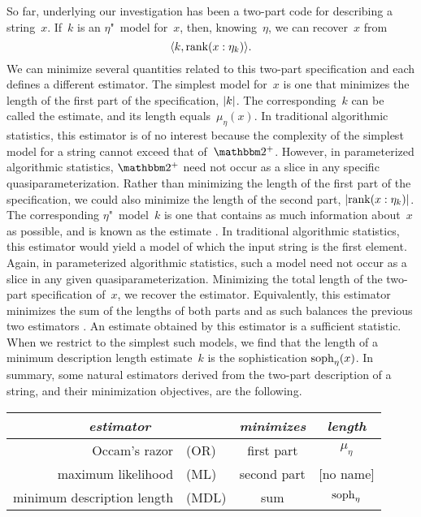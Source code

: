 So far, underlying our investigation has been a two-part code for describing a string~$x$.
If~$k$ is an $\eta$"~model for~$x$, then, knowing~$\eta$, we can recover~$x$ from
\begin{equation}
\label{eq:two-part}
  {\langle k, \operatorname{rank}(x : \eta_k)\rangle}.
\end{equation}
We can minimize several quantities related to this two-part specification and each defines a different estimator.
The simplest model for~$x$ is one that minimizes the length of the first part of the specification, ${\lvert k\rvert}$.
The corresponding~$k$ can be called the  estimate, and its length equals~$\mu_\eta(x)$.
In traditional algorithmic statistics, this estimator is of no interest because the complexity of the simplest model for a string cannot exceed that of~$\binary^+$.
However, in parameterized algorithmic statistics, $\binary^+$ need not occur as a slice in any specific quasiparameterization.
Rather than minimizing the length of the first part of the specification, we could also minimize the length of the second part, ${\lvert\operatorname{rank}(x : \eta_k)\rvert}$.
The corresponding $\eta$"~model~$k$ is one that contains as much information about~$x$ as possible, and is known as the  estimate \parencite{vereshchagin2004kolmogorov}.
In traditional algorithmic statistics, this estimator would yield a model of which the input string is the first element.
Again, in parameterized algorithmic statistics, such a model need not occur as a slice in any given quasiparameterization.
Minimizing the total length of the two-part specification of~$x$, we recover the  estimator.
Equivalently, this estimator minimizes the sum of the lengths of both parts and as such balances the previous two estimators \parencite{vereshchagin2004kolmogorov,rissanen1983universal}.
An estimate obtained by this estimator is a sufficient statistic.
When we restrict to the simplest such models, we find that the length of a minimum description length estimate~$k$ is the sophistication $\operatorname{soph}_\eta(x)$.
In summary, some natural estimators derived from the two-part description of a string, and their minimization objectives, are the following.
\begin{center}
  \begin{tabular}{r@{ }lcc}
    \multicolumn{2}{c}{\emph{estimator}}	& \emph{minimizes}	& \emph{length} \\
    \hline
    Occam's razor&(OR)	& first part	& $\mu_\eta$ \\
    maximum likelihood&(ML)	& second part	& \footnotesize{[no name]} \\
    minimum description length&(MDL)	& sum	& $\operatorname{soph}_\eta$
  \end{tabular}
\end{center}

